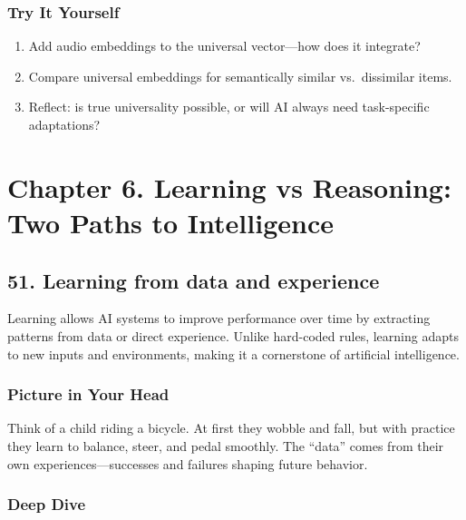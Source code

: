 \documentclass[
  letterpaper,
  DIV=11,
  numbers=noendperiod]{scrreprt}
\providecommand{\tightlist}{%
  \setlength{\itemsep}{0pt}\setlength{\parskip}{0pt}}
\begin{document}
\subsubsection{Try It Yourself}\label{try-it-yourself-49}

\begin{enumerate}
\def\labelenumi{\arabic{enumi}.}
\tightlist
\item
  Add audio embeddings to the universal vector---how does it integrate?
\item
  Compare universal embeddings for semantically similar vs.~dissimilar
  items.
\item
  Reflect: is true universality possible, or will AI always need
  task-specific adaptations?
\end{enumerate}

\section{Chapter 6. Learning vs Reasoning: Two Paths to
Intelligence}\label{chapter-6.-learning-vs-reasoning-two-paths-to-intelligence}

\subsection{51. Learning from data and
experience}\label{learning-from-data-and-experience}

Learning allows AI systems to improve performance over time by
extracting patterns from data or direct experience. Unlike hard-coded
rules, learning adapts to new inputs and environments, making it a
cornerstone of artificial intelligence.

\subsubsection{Picture in Your Head}\label{picture-in-your-head-50}

Think of a child riding a bicycle. At first they wobble and fall, but
with practice they learn to balance, steer, and pedal smoothly. The
``data'' comes from their own experiences---successes and failures
shaping future behavior.

\subsubsection{Deep Dive}\label{deep-dive-50}
\end{document}
